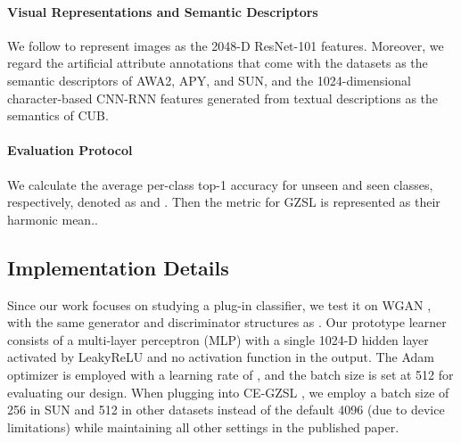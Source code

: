 \documentclass{article}
\begin{document}
\paragraph{Visual Representations and Semantic Descriptors}
We follow \cite{xian2017zero} to represent images as the 2048-D ResNet-101 \cite{he2016deep} features. Moreover, we regard the artificial attribute annotations that come with the datasets as the semantic descriptors of AWA2, APY, and SUN, and the 1024-dimensional character-based CNN-RNN features \cite{reed2016learning} generated from textual descriptions as the semantics of CUB.
	
\paragraph{Evaluation Protocol}
We calculate the average per-class top-1 accuracy for unseen and seen classes, respectively, denoted as  and . Then the metric  for GZSL is represented as their harmonic mean.\cite{xian2017zero}.
	
	\subsection{Implementation Details}
	Since our work focuses on studying a plug-in classifier, we test it on WGAN \cite{gulrajani2017improved}, with the same generator and discriminator structures as \cite{xian2018feature}. Our prototype learner  consists of a multi-layer perceptron (MLP) with a single 1024-D hidden layer activated by LeakyReLU and no activation function in the output. The Adam optimizer is employed with a learning rate of , and the batch size is set at 512 for evaluating our design. When plugging into CE-GZSL \cite{han2021contrastive}, we employ a batch size of 256 in SUN and 512 in other datasets instead of the default 4096 (due to device limitations) while maintaining all other settings in the published paper.
\end{document}
